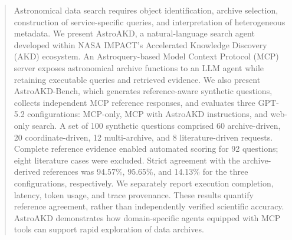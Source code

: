 \documentclass[11pt,twoside]{article}
\begin{document}


\begin{abstract}
Astronomical data search requires object identification, archive selection, construction of service-specific queries, and interpretation of heterogeneous metadata. We present AstroAKD, a natural-language search agent developed within NASA IMPACT's Accelerated Knowledge Discovery (AKD) ecosystem. An Astroquery-based Model Context Protocol (MCP) server exposes astronomical archive functions to an LLM agent while retaining executable queries and retrieved evidence. We also present AstroAKD-Bench, which generates reference-aware synthetic questions, collects independent MCP reference responses, and evaluates three GPT-5.2 configurations: MCP-only, MCP with AstroAKD instructions, and web-only search. A set of 100 synthetic questions comprised 60 archive-driven, 20 coordinate-driven, 12 multi-archive, and 8 literature-driven requests. Complete reference evidence enabled automated scoring for 92 questions; eight literature cases were excluded. Strict agreement with the archive-derived references was 94.57\%, 95.65\%, and 14.13\% for the three configurations, respectively. We separately report execution completion, latency, token usage, and trace provenance. These results quantify reference agreement, rather than independently verified scientific accuracy.
AstroAKD demonstrates how domain-specific agents equipped with MCP tools can support rapid exploration of data archives.
\end{abstract}
\end{document}

